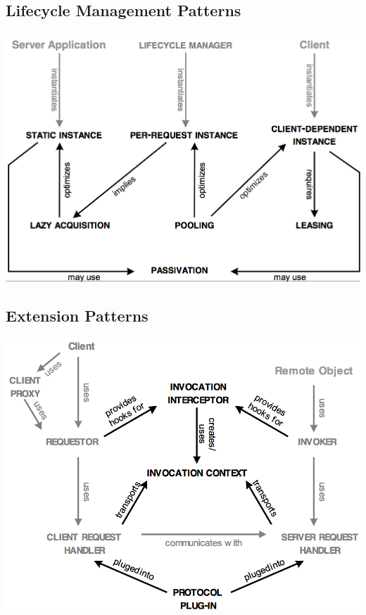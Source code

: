 \documentclass[10pt]{article}
\begin{document}
\subsection{Lifecycle Management Patterns}
\begin{center}
	\includegraphics[scale=0.4]{lifecycle-management-pattern.png}
\end{center}
\subsection{Extension Patterns}
\begin{center}
	\includegraphics[scale=0.4]{extention-pattern.png}
\end{center}

\newpage
\end{document}
